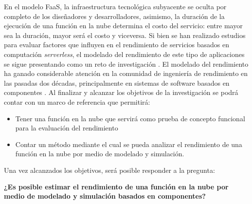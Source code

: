 En el modelo FaaS, la infraestructura tecnológica subyacente se oculta por completo de los diseñadores y desarrolladores, asimismo, la duración de la ejecución de una función en la nube determina el costo del servicio: entre mayor sea la duración, mayor será el costo y viceversa. Si bien se han realizado estudios \cite{8360324} para evaluar factores que influyen en el rendimiento de servicios basados en computación \emph{serverless}, el modelado del rendimiento de este tipo de aplicaciones se sigue presentando como un reto de investigación \cite{Heinrich:2017:PEM:3053600.3053653}. El modelado del rendimiento ha ganado considerable atención en la comunidad de ingeniería de rendimiento en las pasadas dos décadas, principalmente en sistemas de software basados en componentes \cite{Koziolek:2010:PEC:1808359.1808729}. Al finalizar y alcanzar los objetivos de la investigación se podrá contar con un marco de referencia que permitirá:
\begin{itemize}
    \item Tener una función en la nube que servirá como prueba de concepto funcional para la evaluación del rendimiento
    \item Contar un método mediante el cual se pueda analizar el rendimiento de una función en la nube por medio de modelado y simulación.
\end{itemize}


Una vez alcanzados los objetivos, será posible responder a la pregunta:


\textbf{¿Es posible estimar el rendimiento de una función en la nube por medio de modelado y simulación basados en componentes?}